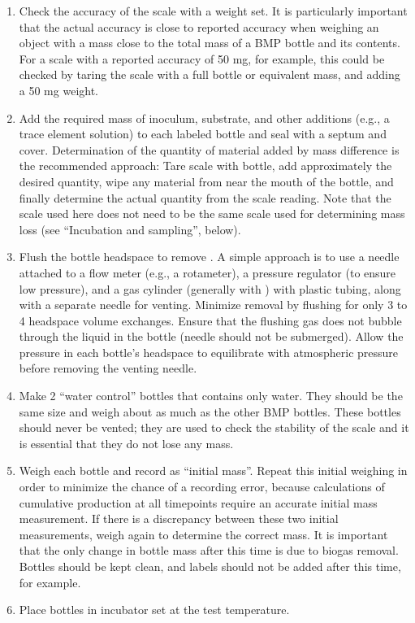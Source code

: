 \documentclass[]{article}
\begin{document}
\begin{enumerate}
    \item Check the accuracy of the scale with a weight set. 
      It is particularly important that the actual accuracy is close to reported accuracy when weighing an object with a mass close to the total mass of a BMP bottle and its contents. 
      For a scale with a reported accuracy of 50 mg, for example, this could be checked by taring the scale with a full bottle or equivalent mass, and adding a 50 mg weight.
    \item Add the required mass of inoculum, substrate, and other additions (e.g., a trace element solution) to each labeled bottle and seal with a septum and cover. 
      Determination of the quantity of material added by mass difference is the recommended approach: Tare scale with bottle, add approximately the desired quantity, wipe any material from near the mouth of the bottle, and finally determine the actual quantity from the scale reading. 
      Note that the scale used here does not need to be the same scale used for determining mass loss (see ``Incubation and sampling'', below).
    \item Flush the bottle headspace to remove . 
      A simple approach is to use a needle attached to a flow meter (e.g., a rotameter), a pressure regulator (to ensure low pressure), and a gas cylinder (generally with ) with plastic tubing, along with a separate needle for venting. 
      Minimize  removal by flushing for only 3 to 4 headspace volume exchanges. 
      Ensure that the flushing gas does not bubble through the liquid in the bottle (needle should not be submerged). 
      Allow the pressure in each bottle’s headspace to equilibrate with atmospheric pressure before removing the venting needle.
    \item Make 2 ``water control'' bottles that contains only water. 
      They should be the same size and weigh about as much as the other BMP bottles. 
      These bottles should never be vented; they are used to check the stability of the scale and it is essential that they do not lose any mass.
    \item Weigh each bottle and record as ``initial mass''. 
      Repeat this initial weighing in order to minimize the chance of a recording error, because calculations of cumulative  production at all timepoints require an accurate initial mass measurement.
      If there is a discrepancy between these two initial measurements, weigh again to determine the correct mass.
      It is important that the only change in bottle mass after this time is due to biogas removal.
      Bottles should be kept clean, and labels should not be added after this time, for example.
    \item Place bottles in incubator set at the test temperature.
\end{enumerate}
\end{document}

